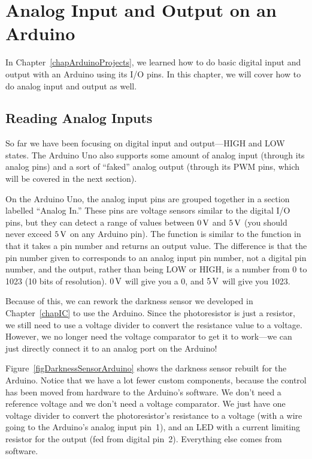 \chapter{Analog Input and Output on an Arduino}

In Chapter~\ref{chapArduinoProjects}, we learned how to do basic digital input and output with an Arduino using its I/O pins.
In this chapter, we will cover how to do analog input and output as well.

\section{Reading Analog Inputs}

So far we have been focusing on digital input and output---HIGH and LOW states.
The Arduino Uno also supports some amount of analog input (through its analog pins) and a sort of ``faked'' analog output (through its PWM pins, which will be covered in the next section).

On the Arduino Uno, the analog input pins are grouped together in a section labelled ``Analog In.''
These pins are voltage sensors similar to the digital I/O pins, but they can detect a range of values between $0\,\si{\volt}$ and $5\,\si{\volt}$ (you should never exceed $5\,\si{\volt}$ on any Arduino pin).
The  function is similar to the  function in that it takes a pin number and returns an output value.
The difference is that the pin number given to  corresponds to an analog input pin number, not a digital pin number, and the output, rather than being LOW or HIGH, is a number from 0 to 1023 (10 bits of resolution).
$0\,\si{\volt}$ will give you a 0, and $5\,\si{\volt}$ will give you 1023.

Because of this, we can rework the darkness sensor we developed in Chapter~\ref{chapIC} to use the Arduino.
Since the photoresistor is just a resistor, we still need to use a voltage divider to convert the resistance value to a voltage.
However, we no longer need the voltage comparator to get it to work---we can just directly connect it to an analog port on the Arduino!


Figure~\ref{figDarknessSensorArduino} shows the darkness sensor rebuilt for the Arduino.
Notice that we have a lot fewer custom components, because the control has been moved from hardware to the Arduino's software.
We don't need a reference voltage and we don't need a voltage comparator.
We just have one voltage divider to convert the photoresistor's resistance to a voltage (with a wire going to the Arduino's analog input pin~1), and an LED with a current limiting resistor for the output (fed from digital pin~2).
Everything else comes from software.

